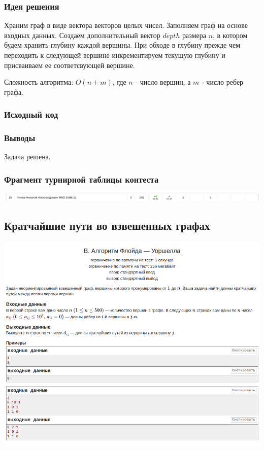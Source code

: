 \subsubsection*{Идея решения}

Храним граф в виде вектора векторов целых чисел. Заполняем граф на основе входных данных. Создаем дополнительный вектор $depth$ размера $n$, в котором будем хранить глубину каждой вершины. 
При обходе в глубину прежде чем переходить к следующей вершине
инкрементируем текущую глубину и присваиваем ее соответсвующей вершине.

Сложность алгоритма: $O(n + m)$, где $n$ - число вершин, а $m$ - число ребер графа. 

\subsubsection*{Исходный код}


\subsubsection*{Выводы}
Задача решена.
\newline

\subsubsection*{Фрагмент турнирной таблицы контеста}
\begin{center}
\includegraphics[width=\textwidth]{standings/Contest7.png}\newline\noindent
\end{center}


\subsection*{Кратчайшие пути во взвешенных графах}

\begin{center}
\includegraphics[width=\textwidth]{statements/Contets8B.png}
\end{center}

